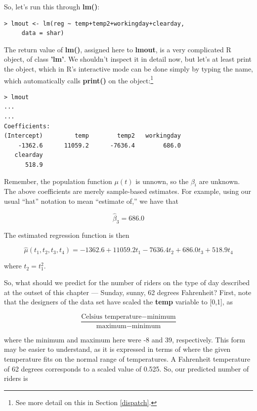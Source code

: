 So, let's run this through {\bf lm()}:

\begin{lstlisting}
> lmout <- lm(reg ~ temp+temp2+workingday+clearday,
     data = shar)
\end{lstlisting}


The return value of {\bf lm()}, assigned here to {\bf lmout}, is a very
complicated R object, of class {\bf 'lm'}.  We shouldn't inspect it in
detail now, but let's at least print the object, which in R's
interactive mode can be done simply by typing the name, which
automatically calls {\bf print()} on the object:\footnote{See more
detail on this in Section \ref{dispatch}.}

\begin{lstlisting}
> lmout
...
...
Coefficients:
(Intercept)         temp        temp2   workingday  
    -1362.6      11059.2      -7636.4        686.0  
   clearday  
      518.9  
\end{lstlisting}

Remember, the population function $\mu(t)$ is unnown, so the $\beta_i$
are unknown.  The above coefficients are merely sample-based estimates.
For example, using our usual ``hat'' notation to mean ``estimate of,''
we have that

\begin{equation}
\widehat{\beta}_3 = 686.0
\end{equation}

The estimated regression function is then

\begin{equation}
\widehat{\mu}(t_1,t_2,t_3,t_4) =
-1362.6 +
11059.2 t_1 -
7636.4 t_2 +
686.0 t_3 +
518.9 t_4 
\end{equation}

where $t_2 = t_1^2$.

So, what should we predict for the number of riders on the type of day
described at the outset of this chapter --- Sunday, sunny, 62 degrees
Fahrenheit?  First, note that the designers of the data set have scaled
the {\bf temp} variable to [0,1], as

\begin{equation}
\frac{\textrm{Celsius temperature} - \textrm{minimum}}
{\textrm{maximum} - \textrm{minimum}}
\end{equation}

where the minimum and maximum here were -8 and 39, respectively.  This
form may be easier to understand, as it is expressed in terms of where
the given temperature fits on the normal range of temperatures.  A
Fahrenheit temperature of 62 degrees corresponds to a scaled value of
0.525.  So, our predicted number of riders is
\label{scaledtemp}

